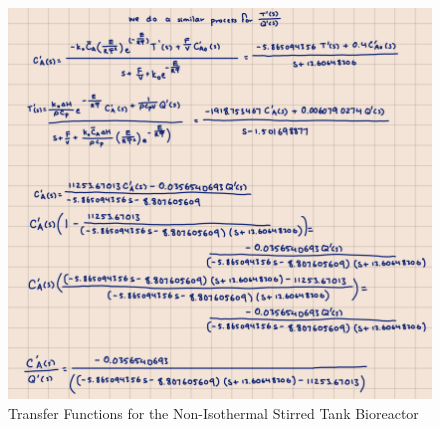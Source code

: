 \documentclass[12pt]{article}
\begin{document}
\begin{enumerate}
\begin{enumerate}
    \begin{figure}[H]
      \centering
      \includegraphics[width=\textwidth]{Figures/handcalc/figure4-4d.png}
      \caption{Transfer Functions for the Non-Isothermal Stirred Tank Bioreactor}
      \label{fig:figure48}
    \end{figure}





  \end{enumerate}

\end{enumerate}
\end{document}
